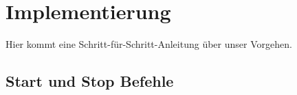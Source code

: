 \chapter{Implementierung}
Hier kommt eine Schritt-für-Schritt-Anleitung über unser Vorgehen.

\section{Start und Stop Befehle}\label{sec:StartStopCommands}
